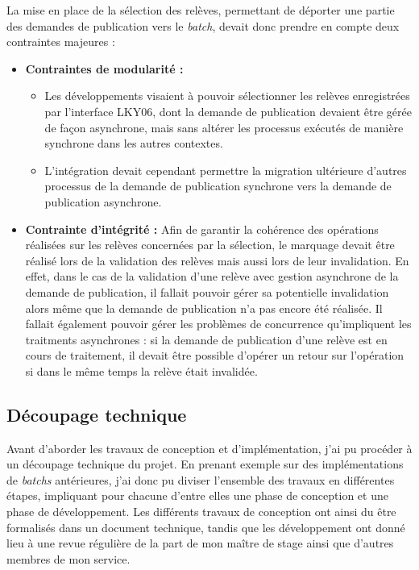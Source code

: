 \documentclass[a4paper, 12pt]{report}
\begin{document}
La mise en place de la sélection des relèves, permettant de déporter une partie des demandes de publication vers le \textit{batch}, devait donc prendre en compte deux contraintes majeures :

\clearpage

\begin{itemize}
  \item \textbf{Contraintes de modularité : }
  \begin{itemize}
    \item Les développements visaient à pouvoir sélectionner les relèves enregistrées par l'interface LKY06, dont la demande de publication devaient être gérée de façon asynchrone, mais sans altérer les processus exécutés de manière synchrone dans les autres contextes.
    \item L'intégration devait cependant permettre la migration ultérieure d'autres processus de la demande de publication synchrone vers la demande de publication asynchrone. 
  \end{itemize}
  \vspace{0.5cm}
  \item \textbf{Contrainte d'intégrité :} Afin de garantir la cohérence des opérations réalisées sur les relèves concernées par la sélection, le marquage devait être réalisé lors de la validation des relèves mais aussi lors de leur invalidation. En effet, dans le cas de la validation d'une relève avec gestion asynchrone de la demande de publication, il fallait pouvoir gérer sa potentielle invalidation alors même que la demande de publication n'a pas encore été réalisée. Il fallait également pouvoir gérer les problèmes de concurrence qu'impliquent les traitments asynchrones : si la demande de publication d'une relève est en cours de traitement, il devait être possible d'opérer un retour sur l'opération si dans le même temps la relève était invalidée.
\end{itemize}

\subsection{Découpage technique}

Avant d'aborder les travaux de conception et d'implémentation, j'ai pu procéder à un découpage technique du projet. En prenant exemple sur des implémentations de \textit{batchs} antérieures, j'ai donc pu diviser l'ensemble des travaux en différentes étapes, impliquant pour chacune d'entre elles une phase de conception et une phase de développement. Les différents travaux de conception ont ainsi du être formalisés dans un document technique, tandis que les développement ont donné lieu à une revue régulière de la part de mon maître de stage ainsi que d'autres membres de mon service.
\end{document}
